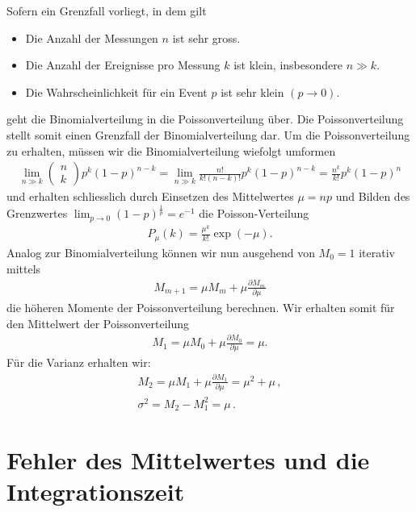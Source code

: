 Sofern ein Grenzfall vorliegt, in dem gilt
\begin{itemize}
    \setlength\itemsep{0em}
        \item Die Anzahl der Messungen $n$ ist sehr gross.
        \item Die Anzahl der Ereignisse pro Messung $k$ ist klein, insbesondere $n \gg k$.
        \item Die Wahrscheinlichkeit für ein Event $p$ ist sehr klein $(p \rightarrow 0)$.
\end{itemize}
geht die Binomialverteilung in die Poissonverteilung über. Die Poissonverteilung stellt somit einen Grenzfall der Binomialverteilung dar. Um die Poissonverteilung zu erhalten, müssen wir die Binomialverteilung wiefolgt umformen
\begin{align}
\lim_{n \gg k} \begin{pmatrix} n \\ k \end{pmatrix} p^k (1 - p)^{n - k} = \lim_{n \gg k} \frac{ n! }{ k! (n - k)! } p^k (1 - p)^{n - k} = \frac{ n^k }{ k! } p^k (1 - p)^n
\end{align}
und erhalten schliesslich durch Einsetzen des Mittelwertes $\mu = np$  und Bilden des Grenzwertes $\lim_{p \rightarrow 0} (1 - p)^{\frac{1}{p}} = e^{-1}$  die Poisson-Verteilung 
\begin{align}
P_{\mu}(k) = \frac{ \mu^k }{ k! } \exp(-\mu) . 
\end{align}
Analog zur Binomialverteilung können wir nun ausgehend von $M_0 = 1$ iterativ mittels
\begin{align}
 M_{m + 1} = \mu M_m + \mu \frac{ \partial M_m }{ \partial \mu }
\end{align}
die höheren Momente der Poissonverteilung berechnen. Wir erhalten somit für den Mittelwert der Poissonverteilung
\begin{align}
 M_1 = \mu M_0 + \mu \frac{ \partial M_0 }{ \partial \mu } = \mu.
\end{align}
Für die Varianz erhalten wir:
\begin{align}
M_2 = \mu M_1 + \mu \frac{ \partial M_1 }{ \partial \mu } = \mu^2 + \mu\,,\\
\sigma^2 =  M_2 - M_1^2 = \mu\,.
\end{align}


\section{Fehler des Mittelwertes und die Integrationszeit}

